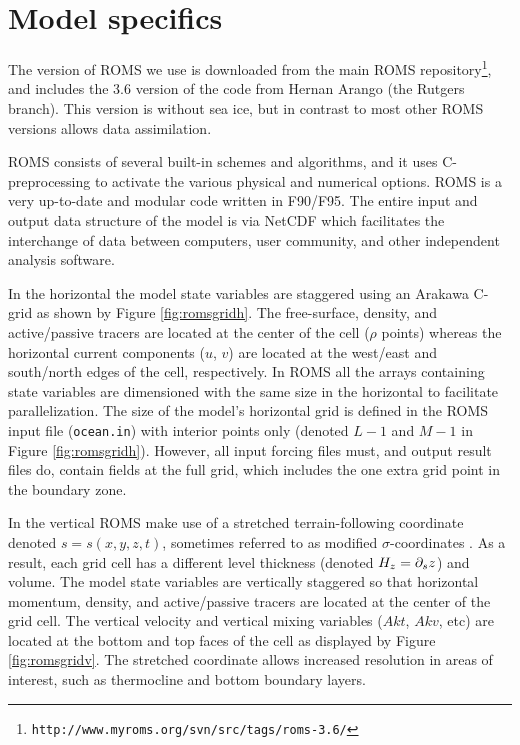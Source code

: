 \section{Model specifics}
\label{sec:setup}
The version of ROMS we use is downloaded from the main ROMS repository\footnote{\texttt{http://www.myroms.org/svn/src/tags/roms-3.6/}}, and includes the 3.6 version of the code from Hernan Arango (the Rutgers branch). This version is without sea ice, but in contrast to most other ROMS versions allows data assimilation.

ROMS consists of several built-in schemes and algorithms, and it uses C-preprocessing to activate the various physical and numerical options. ROMS is a very up-to-date and modular code written in F90/F95. The entire input and output data structure of the model is via NetCDF which facilitates the interchange of data between computers, user community, and other independent analysis software.

In the horizontal the model state variables are staggered using an Arakawa C-grid as shown by Figure \ref{fig:romsgridh}. The free-surface, density, and active/passive tracers are located at the center of the cell ($\rho$ points) whereas the horizontal current components ($u$, $v$) are located at the west/east and south/north edges of the cell, respectively. In ROMS all the arrays containing state variables are dimensioned with the same size in the horizontal to facilitate parallelization. The size of the model's horizontal grid is defined in the ROMS input file (\texttt{ocean.in}) with interior points only (denoted $L-1$ and $M-1$ in Figure \ref{fig:romsgridh}). However, all input forcing files must, and output result files do, contain fields at the full grid, which includes the one extra grid point in the boundary zone.


In the vertical ROMS make use of a stretched terrain-following coordinate denoted $s=s(x,y,z,t)$, sometimes referred to as modified $\sigma$-coordinates \citep{song:haidv:1994}. As a result, each grid cell has a different level thickness (denoted $H_z = \partial_{s} z$) and volume. The model state variables are vertically staggered so that horizontal momentum, density, and active/passive tracers are located at the center of the grid cell. The vertical velocity and vertical mixing variables ($Akt$, $Akv$, etc) are located at the bottom and top faces of the cell as displayed by Figure \ref{fig:romsgridv}. The stretched coordinate allows increased resolution in areas of interest, such as thermocline and bottom boundary layers. 


